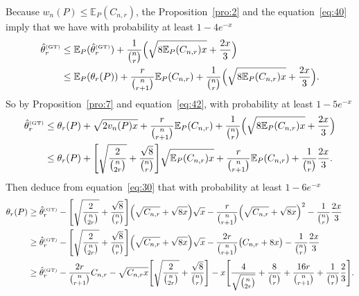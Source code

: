 \documentclass{article}
\newcommand{\1}{\boldsymbol{1}}
\newcommand{\EE}{\mathbb{E}}
\theoremstyle{plain}
\begin{document}
Because $w_n(P) \leq \EE_P(C_{n,r})$, the Proposition~\ref{pro:2} and the equation~\eqref{eq:40} imply that we have with probability at least $1 - 4e^{-x}$
\begin{align*}
  \hat{\theta}_r^{\text{\tiny{(GT)}}}
  &\leq \EE_P(\hat{\theta}_r^{\text{\tiny{(GT)}}}) + \frac{1}{\binom{n}{r}}\Big( \sqrt{8\EE_P(C_{n,r})x} + \frac{2x}{3} \Big)\\
  &\leq \EE_P(\theta_r(P))%
    + \frac{r}{\binom{n}{r+1}}\EE_P(C_{n,r})%
    + \frac{1}{\binom{n}{r}}\Big( \sqrt{8\EE_P(C_{n,r})x} + \frac{2x}{3} \Big).
\end{align*}
So by Proposition~\ref{pro:7} and equation~\eqref{eq:42}, with probability at least $1 - 5e^{-x}$
\begin{align*}
  \hat{\theta}_r^{\text{\tiny{(GT)}}}%
  &\leq \theta_r(P)%
    + \sqrt{2v_n(P)x}
    + \frac{r}{\binom{n}{r+1}}\EE_P(C_{n,r})%
    + \frac{1}{\binom{n}{r}}\Big( \sqrt{8\EE_P(C_{n,r})x} + \frac{2x}{3} \Big)\\
  &\leq \theta_r(P)%
    + \Bigg[ \sqrt{\frac{2}{\binom{n}{2r}}}%
    + \frac{\sqrt{8}}{\binom{n}{r}}
    \Bigg] \sqrt{ \EE_P(C_{n,r}) x}%
    + \frac{r}{\binom{n}{r+1}}\EE_P(C_{n,r})%
    + \frac{1}{\binom{n}{r}}\frac{2x}{3}.
\end{align*}
Then deduce from equation~\eqref{eq:30} that with probability at least $1 - 6e^{-x}$
  \begin{align*}
    \theta_r(P)%
    &\geq \hat{\theta}_r^{\text{\tiny{(GT)}}}%
    - \Bigg[ \sqrt{\frac{2}{\binom{n}{2r}}}%
    + \frac{\sqrt{8}}{\binom{n}{r}}
    \Bigg]\Big(\sqrt{C_{n,r}} + \sqrt{8x} \Big) \sqrt{x}%
    - \frac{r}{\binom{n}{r+1}}\Big(\sqrt{C_{n,r}} + \sqrt{8x} \Big)^2%
    - \frac{1}{\binom{n}{r}}\frac{2x}{3}\\
    &\geq \hat{\theta}_r^{\text{\tiny{(GT)}}}%
    - \Bigg[ \sqrt{\frac{2}{\binom{n}{2r}}}%
    + \frac{\sqrt{8}}{\binom{n}{r}}
    \Bigg]\Big(\sqrt{C_{n,r}} + \sqrt{8x} \Big) \sqrt{x}%
    - \frac{2r}{\binom{n}{r+1}}\big(C_{n,r} + 8x \big)%
      - \frac{1}{\binom{n}{r}}\frac{2x}{3}\\
    &\geq%
      \hat{\theta}_r^{\text{\tiny{(GT)}}}%
      - \frac{2r}{\binom{n}{r+1}}C_{n,r}
      - \sqrt{C_{n,r}x}\Bigg[ \sqrt{\frac{2}{\binom{n}{2r}}}%
    + \frac{\sqrt{8}}{\binom{n}{r}} \Bigg]%
      - x\Bigg[ \frac{4}{\sqrt{\binom{n}{2r}}}%
      + \frac{8}{\binom{n}{r}} + \frac{16r}{\binom{n}{r+1}}%
      +\frac{1}{\binom{n}{r}}\frac{2}{3}
      \Bigg].
  \end{align*}
\end{document}
